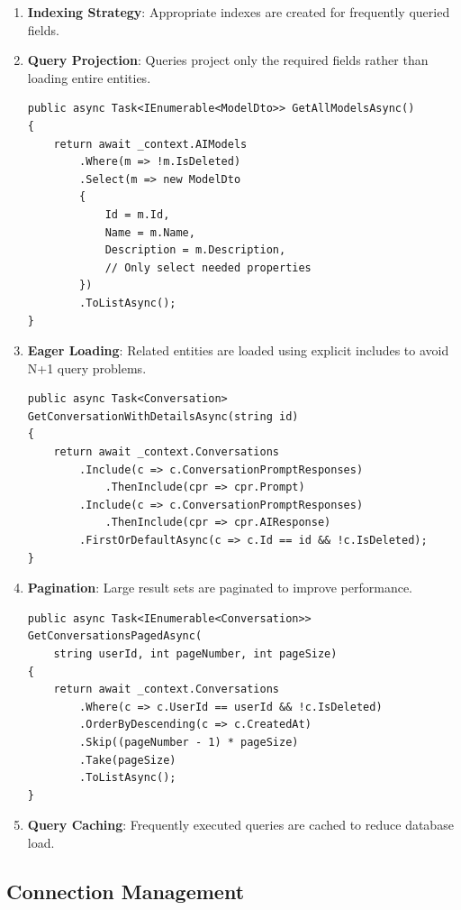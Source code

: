 \begin{enumerate}
   \item \textbf{Indexing Strategy}: Appropriate indexes are created for frequently queried fields.

   \item \textbf{Query Projection}: Queries project only the required fields rather than loading entire entities.

\begin{verbatim}
public async Task<IEnumerable<ModelDto>> GetAllModelsAsync()
{
    return await _context.AIModels
        .Where(m => !m.IsDeleted)
        .Select(m => new ModelDto
        {
            Id = m.Id,
            Name = m.Name,
            Description = m.Description,
            // Only select needed properties
        })
        .ToListAsync();
}
\end{verbatim}

   \item \textbf{Eager Loading}: Related entities are loaded using explicit includes to avoid N+1 query problems.

\begin{verbatim}
public async Task<Conversation> GetConversationWithDetailsAsync(string id)
{
    return await _context.Conversations
        .Include(c => c.ConversationPromptResponses)
            .ThenInclude(cpr => cpr.Prompt)
        .Include(c => c.ConversationPromptResponses)
            .ThenInclude(cpr => cpr.AIResponse)
        .FirstOrDefaultAsync(c => c.Id == id && !c.IsDeleted);
}
\end{verbatim}

   \item \textbf{Pagination}: Large result sets are paginated to improve performance.

\begin{verbatim}
public async Task<IEnumerable<Conversation>> GetConversationsPagedAsync(
    string userId, int pageNumber, int pageSize)
{
    return await _context.Conversations
        .Where(c => c.UserId == userId && !c.IsDeleted)
        .OrderByDescending(c => c.CreatedAt)
        .Skip((pageNumber - 1) * pageSize)
        .Take(pageSize)
        .ToListAsync();
}
\end{verbatim}

   \item \textbf{Query Caching}: Frequently executed queries are cached to reduce database load.
\end{enumerate}

\subsection{Connection Management}

